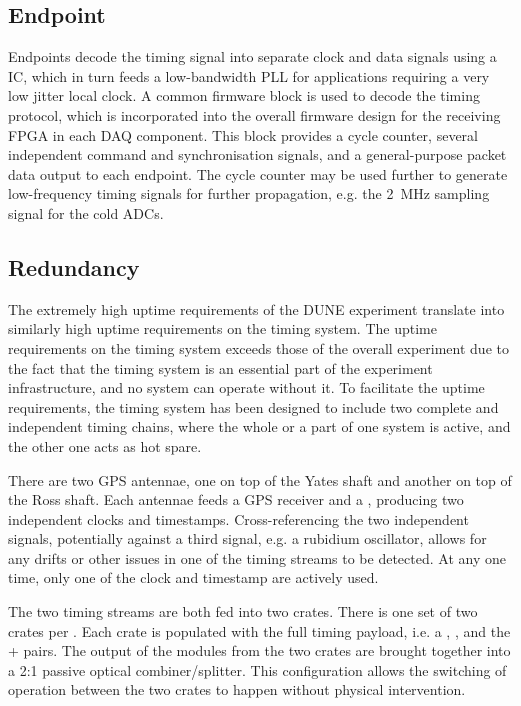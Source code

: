 \documentclass[main.tex]{subfiles}
\begin{document}
\subsection{Endpoint}
Endpoints decode the timing signal into separate clock and data
signals using a  IC, which in turn feeds a low-bandwidth PLL for applications requiring a very low jitter local clock. A common firmware block is used to decode the timing protocol, which is incorporated into the overall firmware design for the receiving FPGA in each DAQ component. This block provides a cycle counter, several independent command and synchronisation signals, and a general-purpose packet data output to each endpoint. The cycle counter may be used further to generate low-frequency timing signals for further propagation, e.g. the \SI{2}{\MHz} sampling signal for the cold ADCs.
\subsection{Redundancy}
The extremely high uptime requirements of the DUNE experiment translate into similarly high uptime requirements on the timing system. The uptime requirements on the timing system exceeds those of the overall experiment due to the fact that the timing system is an essential part of the experiment infrastructure, and no system can operate without it. To facilitate the uptime requirements, the timing system has been designed to include two complete and independent timing chains, where the whole or a part of one system is active, and the other one acts as hot spare.

There are two GPS antennae, one on top of the Yates shaft and another on top of the Ross shaft. Each antennae feeds a GPS receiver and a , producing two independent  clocks and timestamps. Cross-referencing the two independent signals, potentially against a third signal, e.g. a rubidium oscillator, allows for any drifts or other issues in one of the  timing streams to be detected. At any one time, only one of the  clock and timestamp are actively used.

The two  timing streams are both fed into two  crates. There is one set of two  crates per . Each crate is populated with the full timing  payload, i.e. a , , and the + pairs. The output of the  modules from the two  crates are brought together into a 2:1 passive optical combiner/splitter. This configuration allows the switching of operation between the two crates to happen without physical intervention. 
\end{document}
